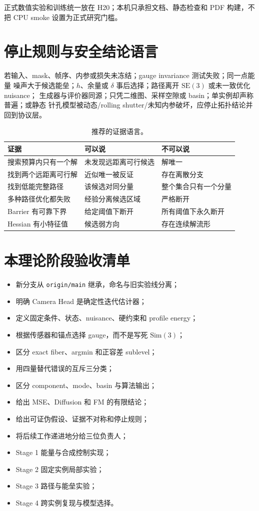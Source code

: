 \documentclass[UTF8,a4paper,11pt]{ctexart}
\newcommand{\SE}{\mathrm{SE}}
\newcommand{\Sim}{\mathrm{Sim}}
\newcommand{\checkeditem}{\item[\textcolor{AccentGreen}{$\checkmark$}]}
\begin{document}
正式数值实验和训练统一放在 H20；本机只承担文档、静态检查和 PDF 构建，不把
CPU smoke 设置为正式研究门槛。

\section{停止规则与安全结论语言}

若输入、mask、帧序、内参或损失未冻结；gauge invariance 测试失败；同一点能量
噪声大于候选能垒；$h$、余量或 $\delta$ 事后选择；路径离开 $\SE(3)$ 或未一致优化 nuisance；
生成器与评价器同源；只凭二维图、采样空隙或 basin；单实例却声称普遍；或静态
针孔模型被动态/rolling shutter/未知内参破坏，应停止拓扑结论并回到协议层。

\begin{table}[htbp]
\centering
\small
\begin{tabularx}{\textwidth}{>{\raggedright\arraybackslash}p{}XX}
\toprule
证据 & 可以说 & 不可以说\\
\midrule
搜索预算内只有一个解 & 未发现远距离可行候选 & 解唯一\\
找到两个远距离可行解 & 近似唯一被反证 & 存在离散分支\\
找到低能完整路径 & 该候选对同分量 & 整个集合只有一个分量\\
多种路径优化都失败 & 经验分离候选区域 & 严格断开\\
Barrier 有可靠下界 & 给定阈值下断开 & 所有阈值下永久断开\\
Hessian 有小特征值 & 候选弱方向 & 存在连续解流形\\
\bottomrule
\end{tabularx}
\caption{推荐的证据语言。}
\end{table}

\section{本理论阶段验收清单}

\begin{itemize}[label=$\square$]
  \checkeditem 新分支从 \texttt{origin/main} 继承，命名与旧实验线分离；
  \checkeditem 明确 Camera Head 是确定性迭代估计器；
  \checkeditem 定义固定条件、状态、nuisance、硬约束和 profile energy；
  \checkeditem 根据传感器和锚点选择 gauge，而不是写死 $\Sim(3)$；
  \checkeditem 区分 exact fiber、argmin 和正容差 sublevel；
  \checkeditem 用四量替代错误的互斥三分类；
  \checkeditem 区分 component、mode、basin 与算法输出；
  \checkeditem 给出 MSE、Diffusion 和 FM 的有限结论；
  \checkeditem 给出可证伪假设、证据不对称和停止规则；
  \checkeditem 将后续工作递进地分给三位负责人；
  \item Stage 1 能量与合成控制实现；
  \item Stage 2 固定实例局部实验；
  \item Stage 3 路径与能垒实验；
  \item Stage 4 跨实例复现与模型选择。
\end{itemize}
\end{document}
